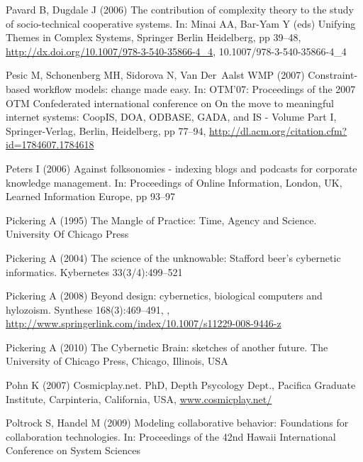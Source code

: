 \documentclass{article}
\begin{document}
\begin{thebibliography}{193}
Pavard B, Dugdale J (2006) The contribution of complexity theory to the study
  of socio-technical cooperative systems. In: Minai AA, Bar-Yam Y (eds)
  Unifying Themes in Complex Systems, Springer Berlin Heidelberg, pp 39--48,
  \urlprefix\url{http://dx.doi.org/10.1007/978-3-540-35866-4_4},
  10.1007/978-3-540-35866-4\_4

Pesic M, Schonenberg MH, Sidorova N, Van Der~Aalst WMP (2007) Constraint-based
  workflow models: change made easy. In: {OTM'07:} Proceedings of the 2007
  {OTM} Confederated international conference on On the move to meaningful
  internet systems: {CoopIS}, {DOA}, {ODBASE}, {GADA}, and {IS} - Volume Part
  I, Springer-Verlag, Berlin, Heidelberg, pp 77--94,
  \urlprefix\url{http://dl.acm.org/citation.cfm?id=1784607.1784618}

Peters I (2006) Against folksonomies - indexing blogs and podcasts for
  corporate knowledge management. In: Proceedings of Online Information,
  London, {UK}, Learned Information Europe, pp 93--97

Pickering A (1995) The Mangle of Practice: Time, Agency and Science. University
  Of Chicago Press

Pickering A (2004) The science of the unknowable: Stafford beer's cybernetic
  informatics. Kybernetes 33(3/4):499--521

Pickering A (2008) Beyond design: cybernetics, biological computers and
  hylozoism. Synthese 168(3):469--491, ,
  \urlprefix\url{http://www.springerlink.com/index/10.1007/s11229-008-9446-z}

Pickering A (2010) The Cybernetic Brain: sketches of another future. The
  University of Chicago Press, Chicago, Illinois, {USA}

Pohn K (2007) Cosmicplay.net. {PhD}, Depth Psycology Dept., Pacifica Graduate
  Institute, Carpinteria, California, {USA},
  \urlprefix\url{www.cosmicplay.net/}

Poltrock S, Handel M (2009) Modeling collaborative behavior: Foundations for
  collaboration technologies. In: Proceedings of the 42nd Hawaii International
  Conference on System Sciences


\end{thebibliography}
\end{document}
